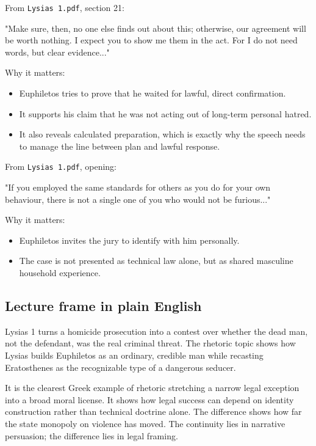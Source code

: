 \documentclass[11pt]{article}
\begin{document}
From \texttt{Lysias 1.pdf}, section 21:

\begin{quotebox}
"Make sure, then, no one else finds out about this; otherwise, our agreement will be worth nothing. I expect you to show me them in the act. For I do not need words, but clear evidence..."
\end{quotebox}

Why it matters:

\begin{itemize}
\item Euphiletos tries to prove that he waited for lawful, direct confirmation.
\item It supports his claim that he was not acting out of long-term personal hatred.
\item It also reveals calculated preparation, which is exactly why the speech needs to manage the line between plan and lawful response.
\end{itemize}

From \texttt{Lysias 1.pdf}, opening:

\begin{quotebox}
"If you employed the same standards for others as you do for your own behaviour, there is not a single one of you who would not be furious..."
\end{quotebox}

Why it matters:

\begin{itemize}
\item Euphiletos invites the jury to identify with him personally.
\item The case is not presented as technical law alone, but as shared masculine household experience.
\end{itemize}

\subsection{Lecture frame in plain English}

Lysias 1 turns a homicide prosecution into a contest over whether the dead man, not the defendant, was the real criminal threat. The rhetoric topic shows how Lysias builds Euphiletos as an ordinary, credible man while recasting Eratosthenes as the recognizable type of a dangerous seducer.

It is the clearest Greek example of rhetoric stretching a narrow legal exception into a broad moral license. It shows how legal success can depend on identity construction rather than technical doctrine alone. The difference shows how far the state monopoly on violence has moved. The continuity lies in narrative persuasion; the difference lies in legal framing.
\end{document}
